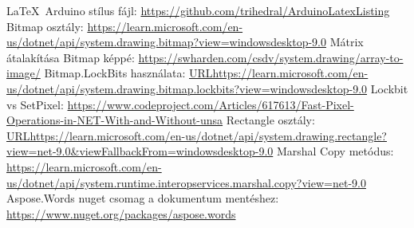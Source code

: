 \documentclass[]{thesis-ekf}
\theoremstyle{definition}
\theoremstyle{remark}
\begin{document}
\begin{thebibliography}{9}
		 \LaTeX\ Arduino stílus fájl: \url{https://github.com/trihedral/ArduinoLatexListing}
		 Bitmap osztály: \url{https://learn.microsoft.com/en-us/dotnet/api/system.drawing.bitmap?view=windowsdesktop-9.0}
		 Mátrix átalakítása Bitmap képpé: \url{https://swharden.com/csdv/system.drawing/array-to-image/}
		 Bitmap.LockBits használata: \url{URLhttps://learn.microsoft.com/en-us/dotnet/api/system.drawing.bitmap.lockbits?view=windowsdesktop-9.0}
		 Lockbit vs SetPixel: \url{https://www.codeproject.com/Articles/617613/Fast-Pixel-Operations-in-NET-With-and-Without-unsa}
		 Rectangle osztály: \url{URLhttps://learn.microsoft.com/en-us/dotnet/api/system.drawing.rectangle?view=net-9.0&viewFallbackFrom=windowsdesktop-9.0}
		 Marshal Copy metódus: \url{https://learn.microsoft.com/en-us/dotnet/api/system.runtime.interopservices.marshal.copy?view=net-9.0}
		 Aspose.Words nuget csomag a dokumentum mentéshez:  \url{https://www.nuget.org/packages/aspose.words}
	\end{thebibliography}
	
	
	
\end{document}
